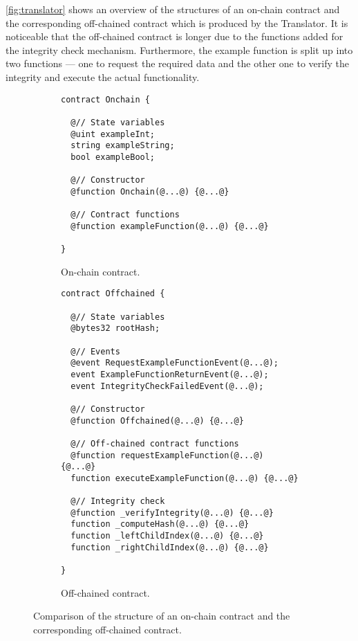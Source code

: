 		\autoref{fig:translator} shows an overview of the structures of an on-chain contract and the corresponding off-chained contract which is produced by the Translator. It is noticeable that the off-chained contract is longer due to the functions added for the integrity check mechanism. Furthermore, the example function is split up into two functions --- one to request the required data and the other one to verify the integrity and execute the actual functionality.

		\begin{figure}
				\centering
				\begin{subfigure}[b]{0.5\linewidth}
					\centering
\begin{lstlisting}[style=base]
contract Onchain {

  @// State variables
  @uint exampleInt;
  string exampleString;
  bool exampleBool;

  @// Constructor
  @function Onchain(@...@) {@...@}

  @// Contract functions
  @function exampleFunction(@...@) {@...@}

}
\end{lstlisting}
					\caption{On-chain contract.}
				\end{subfigure}%
				\begin{subfigure}[b]{0.5\linewidth}
					\centering
\begin{lstlisting}[style=base]
contract Offchained {

  @// State variables
  @bytes32 rootHash;

  @// Events
  @event RequestExampleFunctionEvent(@...@);
  event ExampleFunctionReturnEvent(@...@);
  event IntegrityCheckFailedEvent(@...@);

  @// Constructor
  @function Offchained(@...@) {@...@}

  @// Off-chained contract functions
  @function requestExampleFunction(@...@) {@...@}
  function executeExampleFunction(@...@) {@...@}

  @// Integrity check
  @function _verifyIntegrity(@...@) {@...@}
  function _computeHash(@...@) {@...@}
  function _leftChildIndex(@...@) {@...@}
  function _rightChildIndex(@...@) {@...@}

}
\end{lstlisting}
					\caption{Off-chained contract.}
					\label{}
				\end{subfigure}
				\caption[Translator: Contract Structure Comparison]{Comparison of the structure of an on-chain contract and the corresponding off-chained contract.}
				\label{fig:translator}
			\end{figure}
